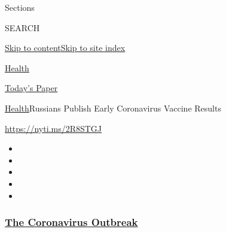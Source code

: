 Sections

SEARCH

\protect\hyperlink{site-content}{Skip to
content}\protect\hyperlink{site-index}{Skip to site index}

\href{https://www.nytimes3xbfgragh.onion/section/health}{Health}

\href{https://myaccount.nytimes3xbfgragh.onion/auth/login?response_type=cookie\&client_id=vi}{}

\href{https://www.nytimes3xbfgragh.onion/section/todayspaper}{Today's
Paper}

\href{/section/health}{Health}\textbar{}Russians Publish Early
Coronavirus Vaccine Results

\url{https://nyti.ms/2R8STGJ}

\begin{itemize}
\item
\item
\item
\item
\item
\end{itemize}

\hypertarget{the-coronavirus-outbreak}{%
\subsubsection{\texorpdfstring{\href{https://www.nytimes3xbfgragh.onion/news-event/coronavirus?name=styln-coronavirus-national\&region=TOP_BANNER\&block=storyline_menu_recirc\&action=click\&pgtype=Article\&impression_id=4fc43c30-f52f-11ea-8b0e-139dcc2f4b62\&variant=undefined}{The
Coronavirus
Outbreak}}{The Coronavirus Outbreak}}\label{the-coronavirus-outbreak}}


